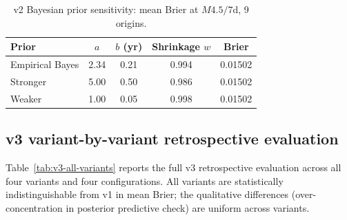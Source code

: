 \documentclass[10pt,a4paper,twocolumn]{article}
\begin{document}
\begin{table}[t]
\centering
\caption{v2 Bayesian prior sensitivity: mean Brier at $M4.5/7$d, 9 origins.}\label{tab:v2-prior-sensitivity}
\small
\begin{tabular*}{\columnwidth}{@{\extracolsep{\fill}}lcccc}
\toprule
Prior & $a$ & $b$ (yr) & Shrinkage $w$ & Brier \\
\midrule
Empirical Bayes & 2.34 & 0.21 & 0.994 & 0.01502 \\
Stronger        & 5.00 & 0.50 & 0.986 & 0.01502 \\
Weaker          & 1.00 & 0.05 & 0.998 & 0.01502 \\
\bottomrule
\end{tabular*}
\end{table}

\subsection{v3 variant-by-variant retrospective evaluation}

Table~\ref{tab:v3-all-variants} reports the full v3 retrospective evaluation across all four variants and four configurations. All variants are statistically indistinguishable from v1 in mean Brier; the qualitative differences (over-concentration in posterior predictive check) are uniform across variants.
\end{document}
